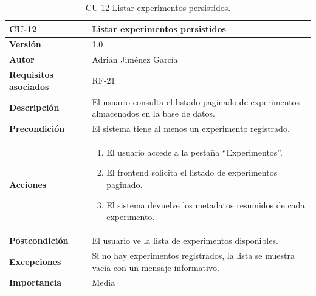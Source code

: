 \begin{table}[p]
	\centering
	\begin{tabularx}{\linewidth}{ p{} X }
		\toprule
		\textbf{CU-12}    & \textbf{Listar experimentos persistidos}\\
		\toprule
		\textbf{Versión}              & 1.0 \\
		\textbf{Autor}                & Adrián Jiménez García \\
		\textbf{Requisitos asociados} & RF-21 \\
		\textbf{Descripción}          & El usuario consulta el listado paginado de experimentos almacenados en la base de datos. \\
		\textbf{Precondición}         & El sistema tiene al menos un experimento registrado. \\
		\textbf{Acciones}             &
		\begin{enumerate}
			\def\labelenumi{\arabic{enumi}.}
			\tightlist
			\item El usuario accede a la pestaña ``Experimentos''.
			\item El frontend solicita el listado de experimentos paginado.
			\item El sistema devuelve los metadatos resumidos de cada experimento.
		\end{enumerate}\\
		\textbf{Postcondición}        & El usuario ve la lista de experimentos disponibles. \\
		\textbf{Excepciones}          & Si no hay experimentos registrados, la lista se muestra vacía con un mensaje informativo. \\
		\textbf{Importancia}          & Media \\
		\bottomrule
	\end{tabularx}
	\caption{CU-12 Listar experimentos persistidos.}
\end{table}

